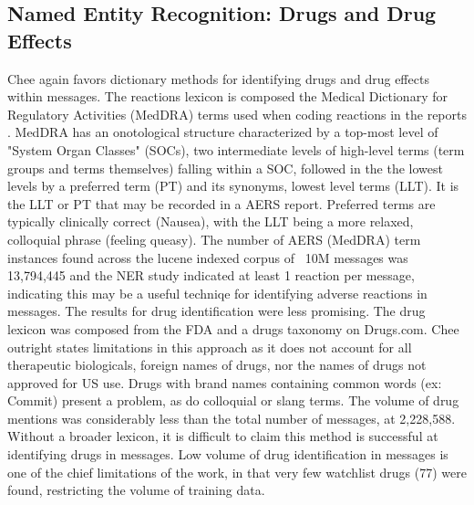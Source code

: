 \documentclass[twoside,11pt]{article}
\begin{document}
\subsection{Named Entity Recognition: Drugs and Drug Effects}
Chee again favors dictionary methods for identifying drugs and drug effects within messages. The reactions lexicon is composed the Medical Dictionary for Regulatory Activities (MedDRA) terms used when coding reactions in the reports \citep{FAERS}. MedDRA has an onotological structure characterized by a top-most level of "System Organ Classes" (SOCs), two intermediate levels of high-level terms (term groups and terms themselves) falling within a SOC, followed in the the lowest levels by a preferred term (PT) and its synonyms, lowest level terms (LLT). It is the LLT or PT that may be recorded in a AERS report. Preferred terms are typically clinically correct (Nausea), with the LLT being a more relaxed, colloquial phrase (feeling queasy). The number of AERS (MedDRA) term instances found across the lucene indexed corpus of ~10M messages was 13,794,445 and the NER study indicated at least 1 reaction per message, indicating this may be a useful techniqe for identifying adverse reactions in messages.
The results for drug identification were less promising.  The drug lexicon was composed from the FDA and a drugs taxonomy on Drugs.com. Chee outright states limitations in this approach as it does not account for all therapeutic biologicals, foreign names of drugs, nor the names of drugs not approved for US use. Drugs with brand names containing common words (ex: Commit) present a problem, as do colloquial or slang terms. The volume of drug mentions was considerably less than the total number of messages, at 2,228,588. Without a broader lexicon, it is difficult to claim this method is successful at identifying drugs in messages. Low volume of drug identification in messages is one of the chief limitations of the work, in that very few watchlist drugs (77) were found, restricting the volume of training data.
\end{document}
